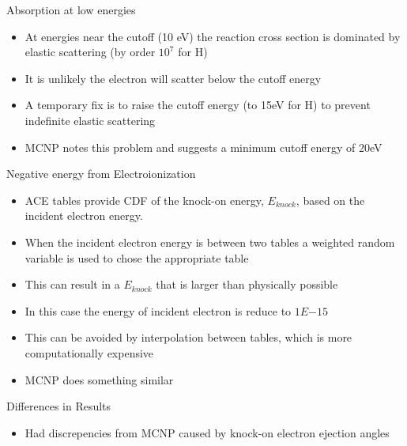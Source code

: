 \documentclass{beamer}
\begin{document}
\begin{frame}{Absorption at low energies}

  \begin{itemize}
    \item At energies near the cutoff (10 eV) the reaction cross section is dominated by elastic scattering (by order $10^7$ for H)
    \item It is unlikely the electron will scatter below the cutoff energy 
    \item A temporary fix is to raise the cutoff energy (to 15eV for H) to prevent indefinite elastic scattering
    \item MCNP notes this problem and suggests a minimum cutoff energy of 20eV
  \end{itemize}

\end{frame}

\begin{frame}{Negative energy from Electroionization}
  
  \begin{itemize}
    \item ACE tables provide CDF of the knock-on energy, $E_{knock}$, based on the incident electron energy.
    \item When the incident electron energy is between two tables a weighted random variable is used to chose the appropriate table
    \item This can result in a $E_{knock}$ that is larger than physically possible
     \item In this case the energy of incident electron is reduce to $1E{-15}$
    \item This can be avoided by interpolation between tables, which is more computationally expensive
     \item MCNP does something similar
  \end{itemize}


\end{frame}

\begin{frame}{Differences in Results}

    \begin{itemize}
     \item Had discrepencies from MCNP caused by knock-on electron ejection angles
 


  \end{itemize}


\end{frame}
  
\end{document}
